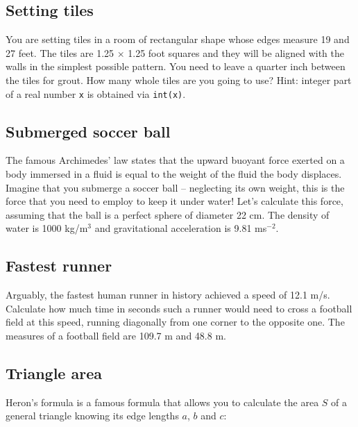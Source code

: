 \subsection{Setting tiles}

You are setting tiles in a room of rectangular shape whose edges measure 19 and 27 feet. 
The tiles are 1.25 $\times$ 1.25 foot squares and they will be aligned with the walls
in the simplest possible pattern. You need 
to leave a quarter inch between the tiles for grout. How many whole tiles are you going to use?
Hint: integer part of a real number {\tt x} is obtained via {\tt int(x)}.


\subsection{Submerged soccer ball}

The famous Archimedes' law states that the upward buoyant force exerted on a body 
immersed in a fluid is equal to the weight of the fluid the body displaces.
Imagine that you submerge a soccer ball -- neglecting its own weight, this 
is the force that you need to employ to keep it under water! Let's calculate 
this force, assuming that the ball is a perfect sphere of diameter 22 cm.
The density of water is 1000 kg/m${^3}$ and gravitational acceleration 
is 9.81 ms${^{-2}}$. 


\subsection{Fastest runner}

Arguably, the fastest human runner in history achieved a speed of 12.1 m/s. 
Calculate how much time in seconds such a runner would need to cross a football 
field at this speed, running diagonally from one corner to the opposite one. 
The measures of a football field are 109.7 m and 48.8 m. 


\subsection{Triangle area}

Heron's formula is a famous formula that allows you to calculate the area $S$ of a 
general triangle knowing its edge lengths $a$, $b$ and $c$:

